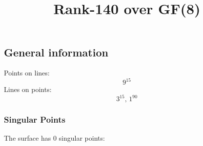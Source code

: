 \documentclass{article}
\newcommand\setTBstruts{\def\T{\rule{0pt}{2.6ex}}%
\def\B{\rule[-1.2ex]{0pt}{0pt}}}
\begin{document}
 
\setTBstruts



{\allowdisplaybreaks%






\title{Rank-140 over GF(8)}
\author{}%
\maketitle%
%
{}



\subsection*{General information}
Points on lines:
$$
9^{15}$$
Lines on points:
$$
3^{15},\,1^{90}$$
\subsubsection*{Singular Points}
The surface has 0 singular points:\\
\begin{align*}
\end{align*}
}
\end{document}

